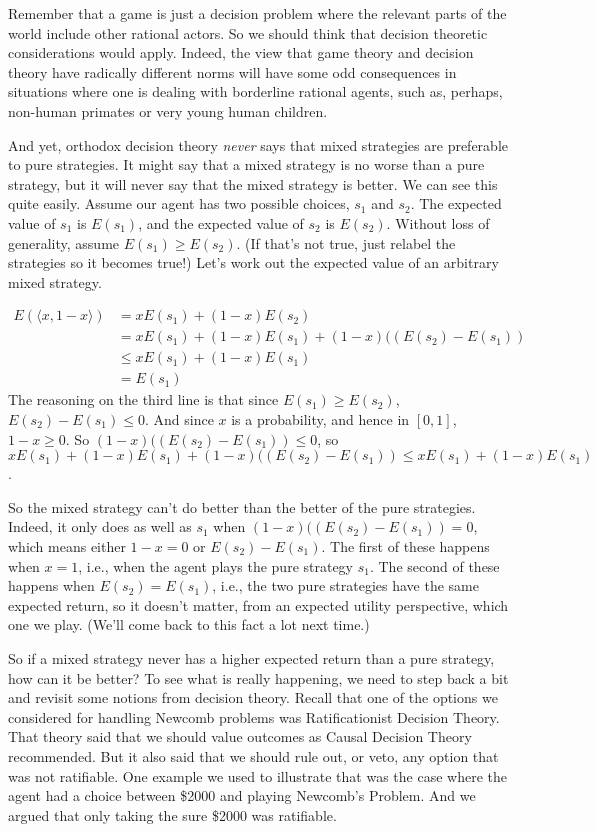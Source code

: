 Remember that a game is just a decision problem where the relevant parts of the world include other rational actors. So we should think that decision theoretic considerations would apply. Indeed, the view that game theory and decision theory have radically different norms will have some odd consequences in situations where one is dealing with borderline rational agents, such as, perhaps, non-human primates or very young human children.

And yet, orthodox decision theory \textit{never} says that mixed strategies are preferable to pure strategies. It might say that a mixed strategy is no worse than a pure strategy, but it will never say that the mixed strategy is better. We can see this quite easily. Assume our agent has two possible choices, $s_1$ and $s_2$. The expected value of $s_1$ is $E(s_1)$, and the expected value of $s_2$ is $E(s_2)$. Without loss of generality, assume $E(s_1) \geq E(s_2)$. (If that's not true, just relabel the strategies so it becomes true!) Let's work out the expected value of an arbitrary mixed strategy.

\begin{align*}
E(\langle x, 1-x \rangle) &= xE(s_1) + (1-x)E(s_2) \\
&= xE(s_1) + (1-x)E(s_1) + (1-x)((E(s_2) - E(s_1)) \\
&\leq  xE(s_1) + (1-x)E(s_1) \\
&= E(s_1) 
\end{align*} \noindent The reasoning on the third line is that since $E(s_1) \geq E(s_2)$, $E(s_2) - E(s_1) \leq 0$. And since $x$ is a probability, and hence in $[0, 1]$, $1-x \geq 0$. So $(1-x)((E(s_2) - E(s_1)) \leq 0$, so $xE(s_1) + (1-x)E(s_1) + (1-x)((E(s_2) - E(s_1)) \leq  xE(s_1) + (1-x)E(s_1)$.

So the mixed strategy can't do better than the better of the pure strategies. Indeed, it only does as well as $s_1$ when $(1-x)((E(s_2) - E(s_1)) = 0$, which means either $1-x = 0$ or  $E(s_2) - E(s_1)$. The first of these happens when $x=1$, i.e., when the agent plays the pure strategy $s_1$. The second of these happens when $E(s_2) = E(s_1)$, i.e., the two pure strategies have the same expected return, so it doesn't matter, from an expected utility perspective, which one we play. (We'll come back to this fact a lot next time.)

So if a mixed strategy never has a higher expected return than a pure strategy, how can it be better? To see what is really happening, we need to step back a bit and revisit some notions from decision theory. Recall that one of the options we considered for handling Newcomb problems was Ratificationist Decision Theory. That theory said that we should value outcomes as Causal Decision Theory recommended. But it also said that we should rule out, or veto, any option that was not ratifiable. One example we used to illustrate that was the case where the agent had a choice between \$2000 and playing Newcomb's Problem. And we argued that only taking the sure \$2000 was ratifiable.

